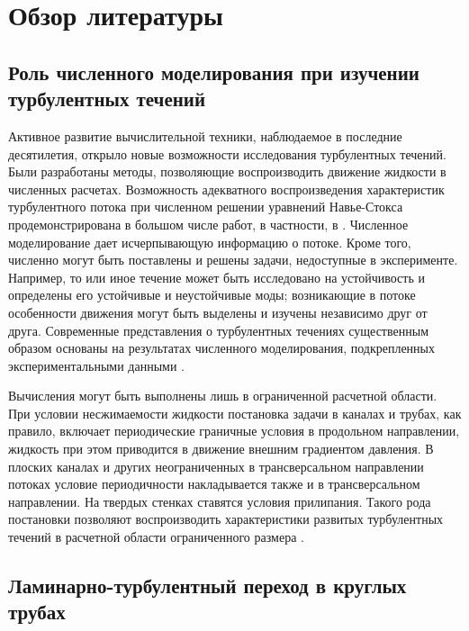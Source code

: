 \chapter{Обзор литературы}

	
\section{Роль численного моделирования при изучении турбулентных течений}

Активное развитие вычислительной техники, наблюдаемое в последние десятилетия, открыло новые возможности исследования турбулентных течений. Были разработаны методы, позволяющие воспроизводить движение жидкости в численных расчетах. Возможность адекватного воспроизведения характеристик турбулентного потока при численном решении уравнений Навье-Стокса продемонстрирована в большом числе работ, в частности, в \cite{Kim1987, Priymak1998, Nikitin2006}. Численное моделирование дает исчерпывающую информацию о потоке. Кроме того, численно могут быть поставлены и решены задачи, недоступные в эксперименте. Например, то или иное течение может быть исследовано на устойчивость и определены его устойчивые и неустойчивые моды; возникающие в потоке особенности движения могут быть выделены и изучены независимо друг от друга. Современные представления о турбулентных течениях существенным образом основаны на результатах численного моделирования, подкрепленных экспериментальными данными \cite{Manneville2015, Manneville2016}.

Вычисления могут быть выполнены лишь в ограниченной расчетной области. При условии несжимаемости жидкости постановка задачи в каналах и трубах, как правило, включает периодические граничные условия в продольном направлении, жидкость при этом приводится в движение внешним градиентом давления. В плоских каналах и других неограниченных в трансверсальном направлении потоках условие периодичности накладывается также и в трансверсальном направлении. На твердых стенках ставятся условия прилипания. Такого рода постановки позволяют воспроизводить характеристики развитых турбулентных течений в расчетной области ограниченного размера \cite{Kim1987, Priymak1998, Nikitin2006}. 


\section{Ламинарно-турбулентный переход в круглых трубах}

